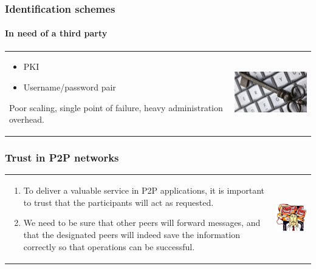 \begin{frame}
\frametitle{Identification schemes}
\framesubtitle{In need of a third party}
\begin{table}
\begin{tabular}{p{7cm}p{3cm}}
\begin{itemize}
    \item PKI
    \item Username/password pair
\end{itemize}

Poor scaling, single point of failure, heavy administration overhead.
&
\vspace{1.5cm}
\includegraphics[width=4cm]{img/keyboard_key}\\
\end{tabular}
\end{table}
\end{frame}

\begin{frame}
\frametitle{Trust in P2P networks}
\begin{table}
\begin{tabular}{p{7cm}p{3cm}}
\begin{enumerate}
    \item To deliver a valuable service in P2P applications, it
is important to trust that the participants will act as requested.
    \item We need to be sure that other peers will forward
messages, and that the designated peers will indeed save the information
correctly so that operations can be successful.
\end{enumerate}
&
\vspace{1.5cm}
\includegraphics[width=4cm]{img/malicious}\\
\end{tabular}
\end{table}
\end{frame}

